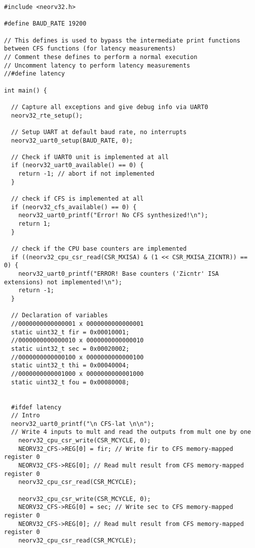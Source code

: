 \begin{code}
\begin{verbatim}
#include <neorv32.h>

#define BAUD_RATE 19200

// This defines is used to bypass the intermediate print functions between CFS functions (for latency measurements)
// Comment these defines to perform a normal execution
// Uncomment latency to perform latency measurements
//#define latency

int main() {

  // Capture all exceptions and give debug info via UART0
  neorv32_rte_setup();

  // Setup UART at default baud rate, no interrupts
  neorv32_uart0_setup(BAUD_RATE, 0);

  // Check if UART0 unit is implemented at all
  if (neorv32_uart0_available() == 0) {
    return -1; // abort if not implemented
  }

  // check if CFS is implemented at all
  if (neorv32_cfs_available() == 0) {
    neorv32_uart0_printf("Error! No CFS synthesized!\n");
    return 1;
  }

  // check if the CPU base counters are implemented
  if ((neorv32_cpu_csr_read(CSR_MXISA) & (1 << CSR_MXISA_ZICNTR)) == 0) {
    neorv32_uart0_printf("ERROR! Base counters ('Zicntr' ISA extensions) not implemented!\n");
    return -1;
  }

  // Declaration of variables 
  //0000000000000001 x 0000000000000001
  static uint32_t fir = 0x00010001;
  //0000000000000010 x 0000000000000010
  static uint32_t sec = 0x00020002;
  //0000000000000100 x 0000000000000100
  static uint32_t thi = 0x00040004;
  //0000000000001000 x 0000000000001000
  static uint32_t fou = 0x00080008;


  #ifdef latency
  // Intro
  neorv32_uart0_printf("\n CFS-lat \n\n");
  // Write 4 inputs to mult and read the outputs from mult one by one
    neorv32_cpu_csr_write(CSR_MCYCLE, 0);
    NEORV32_CFS->REG[0] = fir; // Write fir to CFS memory-mapped register 0
    NEORV32_CFS->REG[0]; // Read mult result from CFS memory-mapped register 0  
    neorv32_cpu_csr_read(CSR_MCYCLE); 

    neorv32_cpu_csr_write(CSR_MCYCLE, 0);
    NEORV32_CFS->REG[0] = sec; // Write sec to CFS memory-mapped register 0
    NEORV32_CFS->REG[0]; // Read mult result from CFS memory-mapped register 0  
    neorv32_cpu_csr_read(CSR_MCYCLE); 


\end{verbatim}
\end{code}
